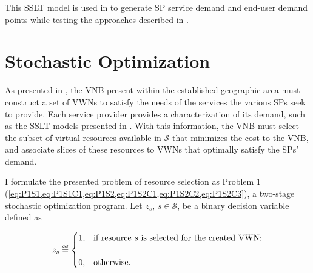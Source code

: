 \documentclass[12pt,dvipsnames]{report}
\newcommand\defeq{\mathrel{\overset{\makebox[0pt]{\mbox{\normalfont\tiny\sffamily def}}}{=}}}
\begin{document}
This SSLT model is used in  to generate SP service demand and end-user demand points while testing the approaches described in .

\section{Stochastic Optimization} \label{sec:stochopt}


As presented in , the VNB present within the established geographic area must construct a set of VWNs to satisfy the needs of the services the various SPs seek to provide.  Each service provider provides a characterization of its demand, such as the SSLT models presented in .  With this information, the VNB must select the subset of virtual resources available in $\mathcal{S}$ that minimizes the cost to the VNB, and associate slices of these resources to VWNs that optimally satisfy the SPs' demand.

I formulate the presented problem of resource selection as Problem 1 (\cref{eq:P1S1,eq:P1S1C1,eq:P1S2,eq:P1S2C1,eq:P1S2C2,eq:P1S2C3}), a two-stage stochastic optimization program.  Let $z_s,\, s \in \mathcal{S}$, be a binary decision variable defined as

\iftrue %
\begin{singlespacing}
\begin{equation} \label{eq:z_s}
z_s \defeq
	\begin{cases}
		1,& \text{if resource $s$ is selected for the created VWN;}\\
		\\
		0,& \text{otherwise.}
	\end{cases}
\end{equation}
\end{singlespacing}
\else
\begin{equation} \label{eq:z_s}
z_s \defeq
	\begin{cases}
		1,& \text{if resource $s$ is selected for the created VWN;}\\
		0,& \text{otherwise,}
	\end{cases}
\end{equation}
\fi
\end{document}
